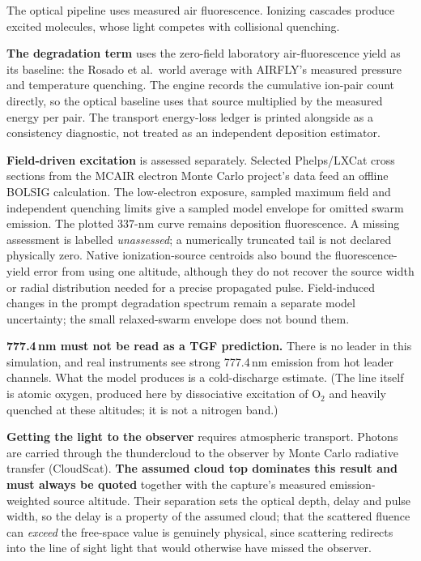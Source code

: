 \documentclass[11pt]{article}
\begin{document}
The optical pipeline uses measured air fluorescence. Ionizing cascades
produce excited molecules, whose light competes with collisional quenching.

\textbf{The degradation term} uses the zero-field laboratory air-fluorescence
yield as its baseline: the Rosado et al.\ world average with AIRFLY's measured
pressure and temperature quenching. The engine records the cumulative
ion-pair count directly, so the optical baseline uses that source multiplied by the measured energy per pair. The
transport energy-loss ledger is printed alongside as a consistency diagnostic,
not treated as an independent deposition estimator.

\textbf{Field-driven excitation} is assessed separately. Selected Phelps/LXCat
cross sections from the MCAIR electron Monte Carlo project's data feed an offline BOLSIG calculation.
The low-electron exposure, sampled maximum field and independent quenching
limits give a sampled model envelope for omitted swarm emission.
The plotted 337-nm curve remains deposition fluorescence. A missing assessment
is labelled \emph{unassessed}; a numerically truncated tail is not declared
physically zero. Native ionization-source centroids also bound the
fluorescence-yield error from using one altitude, although they do not recover the source width or radial
distribution needed for a precise propagated pulse. Field-induced changes in the prompt degradation
spectrum remain a separate model uncertainty; the small relaxed-swarm
envelope does not bound them.

\textbf{777.4\,nm must not be read as a TGF prediction.} There is no leader in
this simulation, and real instruments see strong 777.4\,nm emission from hot
leader channels. What the model produces is a cold-discharge estimate. (The line
itself is atomic oxygen, produced here by dissociative excitation of O$_2$ and
heavily quenched at these altitudes; it is not a nitrogen band.)

\textbf{Getting the light to the observer} requires atmospheric transport.
Photons are carried through the thundercloud to the observer by Monte Carlo
radiative transfer (CloudScat). \textbf{The assumed cloud top dominates this
result and must always be quoted} together with the capture's measured
emission-weighted source altitude. Their separation sets the optical depth,
delay and pulse width, so the delay is a property of the assumed cloud;
that the scattered fluence can \emph{exceed} the free-space value is genuinely
physical, since scattering redirects into the line of sight light that would
otherwise have missed the observer.
\end{document}
